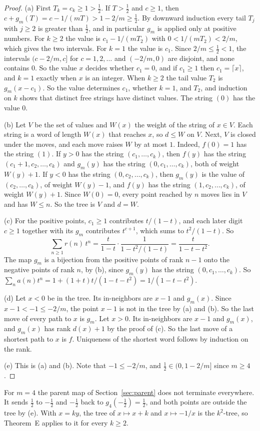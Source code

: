 \begin{proof}
(a) First $T_k=c_k\ge1>\tfrac12$. If $T>\tfrac12$ and $c\ge1$, then
$c+g_m(T)=c-1/(mT)>1-2/m\ge\tfrac12$. By downward induction every tail $T_j$ with $j\ge2$ is greater
than $\tfrac12$, and in particular $g_m$ is applied only at positive numbers. For $k\ge2$ the value is
$c_1-1/(mT_2)$ with $0<1/(mT_2)<2/m$, which gives the two intervals. For $k=1$ the value is $c_1$.
Since $2/m\le\tfrac12<1$, the intervals $(c-2/m,c]$ for $c=1,2,\dots$ and $(-2/m,0)$ are disjoint,
and none contains $0$. So the value $x$ decides whether $c_1=0$, and if $c_1\ge1$ then
$c_1=\lceil x\rceil$, and $k=1$ exactly when $x$ is an integer. When $k\ge2$ the tail value $T_2$ is
$g_m(x-c_1)$. So the value determines $c_1$, whether $k=1$, and $T_2$, and induction on $k$ shows that
distinct free strings have distinct values. The string $(0)$ has the value $0$.

(b) Let $V$ be the set of values and $W(x)$ the weight of the string of $x\in V$. Each string is a word
of length $W(x)$ that reaches $x$, so $d\le W$ on $V$. Next, $V$ is closed under the moves, and each
move raises $W$ by at most $1$. Indeed, $f(0)=1$ has the string $(1)$. If $y>0$ has the string
$(c_1,\dots,c_k)$, then $f(y)$ has the string $(c_1+1,c_2,\dots,c_k)$ and $g_m(y)$ has the string
$(0,c_1,\dots,c_k)$, both of weight $W(y)+1$. If $y<0$ has the string $(0,c_2,\dots,c_k)$, then
$g_m(y)$ is the value of $(c_2,\dots,c_k)$, of weight $W(y)-1$, and $f(y)$ has the string
$(1,c_2,\dots,c_k)$, of weight $W(y)+1$. Since $W(0)=0$, every point reached by $n$ moves lies in $V$
and has $W\le n$. So the tree is $V$ and $d=W$.

(c) For the positive points, $c_1\ge1$ contributes $t/(1-t)$, and each later digit $c\ge1$ together
with its $g_m$ contributes $t^{c+1}$, which sums to $t^2/(1-t)$. So
\[
\sum_{n\ge1}r(n)\,t^n=\frac{t}{1-t}\cdot\frac{1}{1-t^2/(1-t)}=\frac{t}{1-t-t^2}.
\]
The map $g_m$ is a bijection from the positive points of rank $n-1$ onto the negative points of rank
$n$, by (b), since $g_m(y)$ has the string $(0,c_1,\dots,c_k)$. So
$\sum_n a(n)t^n=1+(1+t)t/(1-t-t^2)=1/(1-t-t^2)$.

(d) Let $x<0$ be in the tree. Its in-neighbors are $x-1$ and $g_m(x)$. Since $x-1<-1\le-2/m$, the
point $x-1$ is not in the tree by (a) and (b). So the last move of every path to $x$ is $g_m$. Let
$x>0$. Its in-neighbors are $x-1$ and $g_m(x)$, and $g_m(x)$ has rank $d(x)+1$ by the proof of (c).
So the last move of a shortest path to $x$ is $f$. Uniqueness of the shortest word follows by
induction on the rank.

(e) This is (a) and (b). Note that $-1\le-2/m$, and $\tfrac12\in(0,1-2/m]$ since $m\ge4$.
\end{proof}

For $m=4$ the parent map of Section~\ref{sec:parent} does not terminate everywhere. It sends
$\tfrac12$ to $-\tfrac12$ and $-\tfrac12$ back to $g_4(-\tfrac12)=\tfrac12$, and both points are
outside the tree by (e). With $x=ky$, the tree of $x\mapsto x+k$ and $x\mapsto-1/x$ is the $k^2$-tree,
so Theorem~E applies to it for every $k\ge2$.
